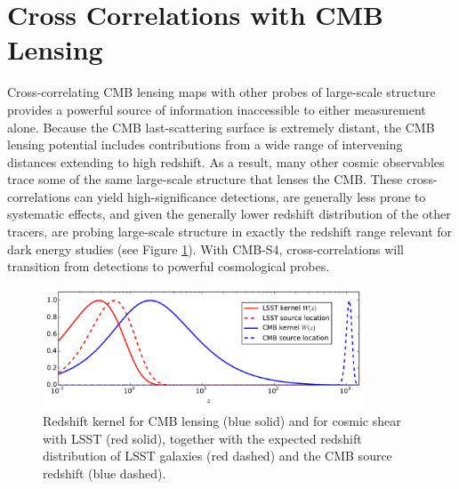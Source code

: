 \section{Cross Correlations with CMB Lensing}\label{cross}

Cross-correlating CMB lensing maps with other probes of large-scale structure provides a powerful source of information inaccessible to either measurement alone. Because the CMB last-scattering surface is extremely distant, the CMB lensing potential includes contributions from a wide range of 
intervening distances extending to high redshift. As a result, many other cosmic observables trace some of the same large-scale structure that lenses the CMB. These cross-correlations can yield high-significance detections, are generally less prone to systematic effects, and given the generally lower redshift distribution of the other tracers, are probing large-scale structure in exactly the redshift range relevant for dark energy studies (see Figure \ref{cmb-gal-kernels}). 
With CMB-S4, cross-correlations will transition from detections to powerful cosmological probes. 

\begin{figure}[htbp]
\centering
\includegraphics[width=0.85\textwidth]{CMBLensing/CMB_effs.pdf}
\caption{Redshift kernel for CMB lensing (blue solid) and for cosmic shear with LSST (red solid), together with the expected redshift distribution of LSST galaxies (red dashed) and the CMB source redshift (blue dashed).}
\label{cmb-gal-kernels}
\end{figure}

